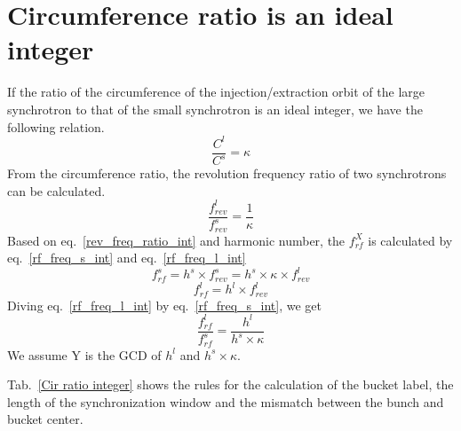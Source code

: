 \section{ Circumference ratio is an ideal integer}

If the ratio of the circumference of the injection/extraction orbit of the large synchrotron to that of the small synchrotron is an ideal integer, we have the following relation. 
\begin{equation}
\frac{C^l}{C^s}=\kappa \label{circumference_ratio_int}
\end{equation}
From the circumference ratio, the revolution frequency ratio of two synchrotrons can be calculated.
\begin{equation}
\frac{f_{rev}^{l}}{f_{rev}^{s}}=\frac{1}{\kappa} \label{rev_freq_ratio_int}
\end{equation}
Based on eq.~\ref{rev_freq_ratio_int} and harmonic number, the $f_{rf}^{X}$ is calculated by eq.~\ref{rf_freq_s_int} and eq.~\ref{rf_freq_l_int}
\begin{equation} 
f_{rf}^{s}= h^s \times f_{rev}^{s}=h^s \times \kappa \times f_{rev}^{l} \label{rf_freq_s_int}
\end{equation}
\begin{equation} 
f_{rf}^{l}= h^l \times f_{rev}^{l} \label{rf_freq_l_int}
\end{equation}
Diving eq.~\ref{rf_freq_l_int} by eq.~\ref{rf_freq_s_int}, we get
\begin{equation} 
\frac{f_{rf}^{l}}{f_{rf}^{s}}= \frac{h^l}{h^s \times \kappa} \label{rf_freq_ratio}
\end{equation}
We assume Y is the GCD of $h^l$ and $h^s \times \kappa$.

Tab.~\ref{Cir ratio integer} shows the rules for the calculation of the bucket label, the length of the synchronization window and the mismatch between the bunch and bucket center. 

